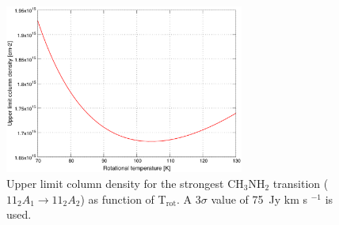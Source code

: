 \begin{figure}[htbp]
  \centering
  \includegraphics[width=0.7\textwidth]{LMSFR/L483.eps}
  \caption{Upper limit column density for the strongest CH$_{3}$NH$_{2}$ transition
  ($11_{2}A_{1} \rightarrow 11_{2}A_{2}$) as function of T$_{\textrm{rot}}$. A 3$\sigma$ value of 
  75\ Jy km s $^{-1}$ is used.}
  \label{L483_MA}
\end{figure}



